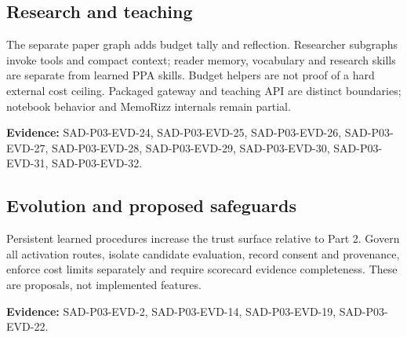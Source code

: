 \documentclass[10pt,letterpaper]{article}
\begin{document}
\subsection{Research and teaching}
The separate paper graph adds budget tally and reflection. Researcher subgraphs invoke tools and compact context; reader memory, vocabulary and research skills are separate from learned PPA skills. Budget helpers are not proof of a hard external cost ceiling. Packaged gateway and teaching API are distinct boundaries; notebook behavior and MemoRizz internals remain partial.\par\textbf{Evidence:} SAD-P03-EVD-24, SAD-P03-EVD-25, SAD-P03-EVD-26, SAD-P03-EVD-27, SAD-P03-EVD-28, SAD-P03-EVD-29, SAD-P03-EVD-30, SAD-P03-EVD-31, SAD-P03-EVD-32.\par

\subsection{Evolution and proposed safeguards}
Persistent learned procedures increase the trust surface relative to Part 2. Govern all activation routes, isolate candidate evaluation, record consent and provenance, enforce cost limits separately and require scorecard evidence completeness. These are proposals, not implemented features.\par\textbf{Evidence:} SAD-P03-EVD-2, SAD-P03-EVD-14, SAD-P03-EVD-19, SAD-P03-EVD-22.\par
\end{document}
